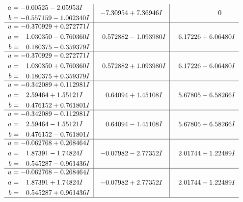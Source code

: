 \documentclass[1p]{elsarticle_modified}
\theoremstyle{definition}
\begin{document}
$$\begin{array}{c|c|c}
\begin{aligned}
a &= -0.00525 - 2.05953 I \\
b &= -0.557159 - 1.062340 I\end{aligned}
 & -7.30954 + 7.36946 I & \phantom{-0.000000 } 0 \\ \hline\begin{aligned}
u &= -0.370929 + 0.272771 I \\
a &= \phantom{-}1.030350 - 0.760360 I \\
b &= \phantom{-}0.180375 - 0.359379 I\end{aligned}
 & \phantom{-}0.572882 - 1.093980 I & \phantom{-}6.17226 + 6.06480 I \\ \hline\begin{aligned}
u &= -0.370929 - 0.272771 I \\
a &= \phantom{-}1.030350 + 0.760360 I \\
b &= \phantom{-}0.180375 + 0.359379 I\end{aligned}
 & \phantom{-}0.572882 + 1.093980 I & \phantom{-}6.17226 - 6.06480 I \\ \hline\begin{aligned}
u &= -0.342089 + 0.112981 I \\
a &= \phantom{-}2.59464 + 1.55121 I \\
b &= \phantom{-}0.476152 + 0.761801 I\end{aligned}
 & \phantom{-}0.64094 + 1.45108 I & \phantom{-}5.67805 - 6.58266 I \\ \hline\begin{aligned}
u &= -0.342089 - 0.112981 I \\
a &= \phantom{-}2.59464 - 1.55121 I \\
b &= \phantom{-}0.476152 - 0.761801 I\end{aligned}
 & \phantom{-}0.64094 - 1.45108 I & \phantom{-}5.67805 + 6.58266 I \\ \hline\begin{aligned}
u &= -0.062768 + 0.268464 I \\
a &= \phantom{-}1.87391 - 1.74824 I \\
b &= \phantom{-}0.545287 - 0.961436 I\end{aligned}
 & -0.07982 - 2.77352 I & \phantom{-}2.01744 + 1.22489 I \\ \hline\begin{aligned}
u &= -0.062768 - 0.268464 I \\
a &= \phantom{-}1.87391 + 1.74824 I \\
b &= \phantom{-}0.545287 + 0.961436 I\end{aligned}
 & -0.07982 + 2.77352 I & \phantom{-}2.01744 - 1.22489 I\\
 \hline 
 \end{array}$$\newpage
\end{document}
